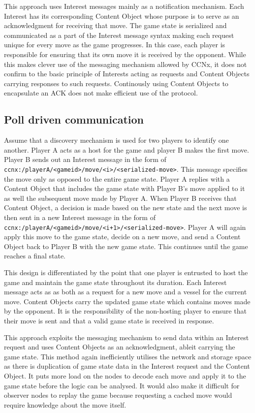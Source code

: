 \documentclass[a4paper,12pt]{report}      %
\begin{document}
\begin{descripton}
This approach uses Interest messages mainly as a notification mechanism. Each Interest has its
corresponding Content Object whose purpose is to serve as an acknowledgment for receiving that
move. The game state is serialized and communicated as a part of the Interest message syntax making
each request unique for every move as the game progresses. In this case, each player is responsible for
ensuring that its own move it is received by the opponent. While this makes clever use of the messaging
mechanism allowed by CCNx, it does not confirm to the basic principle of Interests acting as requests and 
Content Objects carrying responses to such requests. Continously using Content Objects to encapsulate an ACK 
does not make efficient use of the protocol.

\subsection{Poll driven communication}

Assume that a discovery mechanism is used for two players to identify one another. Player A acts as a
host for the game and player B makes the first move. Player B sends out an Interest message in the
form of \verb!ccnx:/playerA/<gameid>/move/<i>/<serialized-move>!. This message specifies the move only 
as opposed to the entire game state. Player A replies with a Content Object that includes the game state
with Player B's move applied to it as well the subsequent move made by Player A. When Player B
receives that Content Object, a decision is made based on the new state and the next move is then sent 
in a new Interest message in the form of \verb!ccnx:/playerA/<gameid>/move/<i+1>/<serialized-move>!. 
Player A will again apply this move to the game state, decide on a new move, and send a Content
Object back to Player B with the new game state. This continues until the game reaches a final state.

This design is differentiated by the point that one player is entrusted to host the game and maintain the
game state throughout its duration. Each Interest message acts as as both as a request for a new move
and a vessel for the current move. Content Objects carry the updated game state which contains moves
made by the opponent. It is the responsibility of the non-hosting player to ensure that their move is sent
and that a valid game state is received in response.

This approach exploits the messaging mechanism to send data within an Interest request and uses Content Objects
as an acknowledgment, ableit carrying the game state. This method again inefficiently utilises the network and storage space
 as there is duplication of game state data in the Interest request and the Content Object. It puts more load on the nodes
to decode each move and apply it to the game state before the logic can be analysed. It would also make it difficult
for observer nodes to replay the game because requesting a cached move would require knowledge about the move itself.



\end{descripton}
\end{document}
